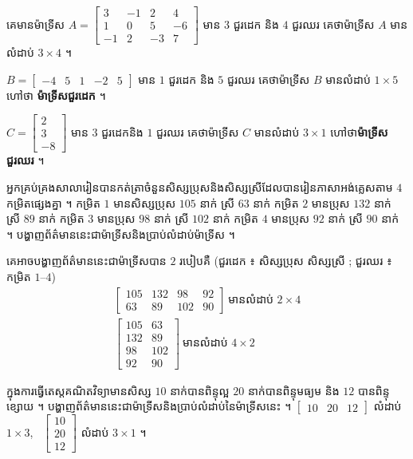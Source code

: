 \begin{example}[ឧទាហរណ៍]
គេមានម៉ាទ្រីស $A = \begin{bmatrix} 3 & -1 & 2 & 4\\ 1 & 0 & 5 & -6\\ -1 & 2 & -3 & 7 \end{bmatrix}$ មាន $3$ ជួរដេក និង $4$ ជួរឈរ គេថាម៉ាទ្រីស $A$ មានលំដាប់ $3 \times 4$ ។

$B = \begin{bmatrix} -4 & 5 & 1 & -2 & 5 \end{bmatrix}$ មាន $1$ ជួរដេក និង $5$ ជួរឈរ គេថាម៉ាទ្រីស $B$ មានលំដាប់ $1 \times 5$ ហៅថា \textbf{ម៉ាទ្រីសជួរដេក} ។

$C = \begin{bmatrix} 2\\ 3\\ -8 \end{bmatrix}$ មាន $3$ ជួរដេកនិង $1$ ជួរឈរ គេថាម៉ាទ្រីស $C$ មានលំដាប់ $3 \times 1$ ហៅថា\textbf{ម៉ាទ្រីសជួរឈរ} ។
\end{example}

\begin{example}[លំហាត់គំរូ ១]
អ្នកគ្រប់គ្រងសាលារៀនបានកត់ត្រាចំនួនសិស្សប្រុសនិងសិស្សស្រីដែលបានរៀនភាសាអង់គ្លេសតាម $4$ កម្រិតផ្សេងគ្នា ។ កម្រិត $1$ មានសិស្សប្រុស $105$ នាក់ ស្រី $63$ នាក់ កម្រិត $2$ មានប្រុស $132$ នាក់ ស្រី $89$ នាក់ កម្រិត $3$ មានប្រុស $98$ នាក់ ស្រី $102$ នាក់ កម្រិត $4$ មានប្រុស $92$ នាក់ ស្រី $90$ នាក់ ។ បង្ហាញព័ត៌មាននេះជាម៉ាទ្រីសនិងប្រាប់លំដាប់ម៉ាទ្រីស ។
\end{example}
\ans
គេអាចបង្ហាញព័ត៌មាននេះជាម៉ាទ្រីសបាន $2$ របៀបគឺ (ជួរដេក ៖ សិស្សប្រុស សិស្សស្រី ; ជួរឈរ ៖ កម្រិត $1$–$4$)
\[
\begin{gathered}
\begin{bmatrix} 105 & 132 & 98 & 92\\ 63 & 89 & 102 & 90 \end{bmatrix} \ \text{មានលំដាប់ } 2 \times 4\\
\begin{bmatrix} 105 & 63\\ 132 & 89\\ 98 & 102\\ 92 & 90 \end{bmatrix} \ \text{មានលំដាប់ } 4 \times 2
\end{gathered}
\]

\begin{pro}
ក្នុងការធ្វើតេស្តគណិតវិទ្យាមានសិស្ស $10$ នាក់បានពិន្ទុល្អ $20$ នាក់បានពិន្ទុមធ្យម និង $12$ បានពិន្ទុខ្សោយ ។ បង្ហាញព័ត៌មាននេះជាម៉ាទ្រីសនិងប្រាប់លំដាប់នៃម៉ាទ្រីសនេះ ។
\ans
$\begin{bmatrix} 10 & 20 & 12 \end{bmatrix}$ លំដាប់ $1 \times 3$, \ $\begin{bmatrix} 10\\ 20\\ 12 \end{bmatrix}$ លំដាប់ $3 \times 1$ ។
\end{pro}

